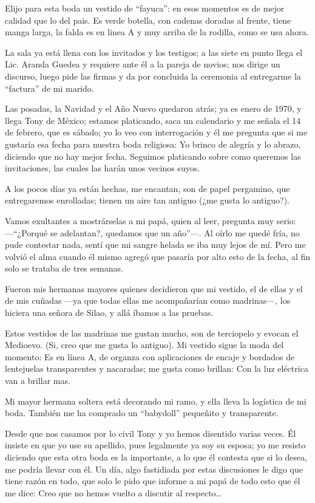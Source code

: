 \documentclass[letterpaper, 12pt]{book}
\begin{document}
Elijo para esta boda un vestido de ``fayuca'': en esos momentos es de mejor calidad que lo del pais. Es verde botella, con cadenas doradas al frente, tiene manga larga, la falda es en linea A y muy arriba de la rodilla, como se usa ahora.

La sala ya está llena con los invitados y los testigos; a las siete en punto llega el Lic. Aranda Guedea y requiere ante él a la pareja de novios; nos dirige un discurso, luego pide las firmas y da por concluida la ceremonia al entregarme la ``factura'' de mi marido.

Las posadas, la Navidad y el Año Nuevo quedaron atrás; ya es enero de 1970, y llega Tony de México; estamos platicando, saca un calendario y me señala el 14 de febrero, que es sábado; yo lo veo con interrogación y él me pregunta que si me gustaría esa fecha para nuestra boda religiosa: Yo brinco de alegría y lo abrazo, diciendo que no hay mejor fecha. Seguimos platicando sobre como queremos las invitaciones, las cuales las harán unos vecinos suyos.

A los pocos días ya están hechas, me encantan, son de papel pergamino, que entregaremos enrolladas; tienen un aire tan antiguo (¿me gusta lo antiguo?).

Vamos exultantes a mostrárselas a mi papá, quien al leer, pregunta muy serio: ---``¿Porqué se adelantan?, quedamos que un año''---. Al oírlo me quedé fría, no pude contestar nada, sentí que mi sangre helada se iba muy lejos de mí. Pero me volvió el alma cuando él mismo agregó que pasaría por alto esto de la fecha, al fin solo se trataba de tres semanas.

Fueron mis hermanas mayores quienes decidieron que mi vestido, el de ellas y el de mis cuñadas ---ya que todas ellas me acompañarían como madrinas---, los hiciera una señora de Silao, y allá íbamos a las pruebas.

Estos vestidos de las madrinas me gustan mucho, son de terciopelo y evocan el Medioevo. (Si, creo que me gusta lo antiguo).  
Mi vestido sigue la moda del momento: Es en línea A, de organza con aplicaciones de encaje y bordados de lentejuelas transparentes y nacaradas; me gusta como brillan: Con la luz eléctrica van a brillar mas.

Mi mayor hermana soltera está decorando mi ramo, y ella lleva la logística de mi boda. También me ha comprado un ``babydoll'' pequeñito y transparente.

Desde que nos casamos por lo civil Tony y yo hemos disentido varias veces. Él insiste en que yo use su apellido, pues legalmente ya soy su esposa; yo me resisto diciendo que esta otra boda es la importante, a lo que él contesta que si lo desea, me podría llevar con él. Un día, algo fastidiada por estas discusiones le digo que tiene razón en todo, que solo le pido que informe a mi papá de todo esto que él me dice: Creo que no hemos vuelto a discutir al respecto\ldots
\end{document}
